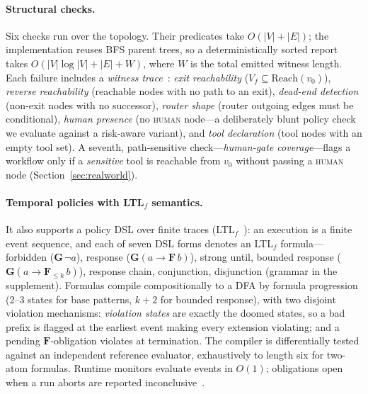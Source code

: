 \paragraph{Structural checks.}
Six checks run over the topology. Their predicates take $O(|V|+|E|)$; the
implementation reuses BFS parent trees, so a deterministically sorted report
takes $O(|V|\log|V|+|E|+W)$, where $W$ is the total emitted witness length.
Each failure includes a
\emph{witness trace}~\citep{clarke1999modelchecking}: \emph{exit
reachability} ($V_f\subseteq\mathrm{Reach}(v_0)$), \emph{reverse reachability}
(reachable nodes with no path to an exit), \emph{dead-end detection} (non-exit
nodes with no successor), \emph{router shape} (router outgoing edges must be
conditional), \emph{human presence} (no \textsc{human} node---a deliberately
blunt policy check we evaluate against a risk-aware variant), and \emph{tool
declaration} (tool nodes with an empty tool set). A seventh, path-sensitive
check---\emph{human-gate coverage}---flags a workflow only if a \emph{sensitive}
tool is reachable from $v_0$ without passing a \textsc{human} node
(Section~\ref{sec:realworld}).

\paragraph{Temporal policies with LTL$_f$ semantics.}
It also supports a policy DSL over finite traces
(LTL$_f$~\citep{degiacomo2013ltlf}): an execution is a finite event sequence, and
each of seven DSL forms denotes an LTL$_f$ formula---forbidden ($\mathbf{G}\,\neg
a$), response ($\mathbf{G}(a \rightarrow \mathbf{F}\,b)$), strong until, bounded
response ($\mathbf{G}(a \rightarrow \mathbf{F}_{\leq k}\,b)$), response chain,
conjunction, disjunction (grammar in the supplement). Formulas compile
compositionally to a DFA by formula progression (2--3 states for base patterns,
$k{+}2$ for bounded response), with two disjoint violation mechanisms:
\emph{violation states} are exactly the doomed states, so a bad prefix is
flagged at the earliest event making every extension violating; and a pending
$\mathbf{F}$-obligation violates at termination. The compiler is differentially
tested against an independent reference evaluator, exhaustively to length six
for two-atom formulas. Runtime monitors evaluate events in $O(1)$; obligations
open when a run aborts are reported inconclusive~\citep{bauer2011ltl3}.

